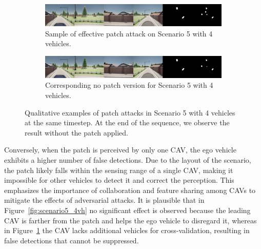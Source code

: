 \begin{figure}[tph]
    \centering

    \begin{subfigure}[b]{1\textwidth}
        \centering
        \includegraphics[width=\textwidth]{figures/results/scenario5.png}
        \caption{Sample of effective patch attack on Scenario 5 with 4 vehicles.}
        \label{fig:scenario5_4vh_effect}
    \end{subfigure}
    \vspace{0.5cm}

    \begin{subfigure}[b]{1\textwidth}
        \centering
        \includegraphics[width=\textwidth]{figures/results/scenario5gt.png}
        \caption{Corresponding no patch version for Scenario 5 with 4 vehicles.}
        \label{fig:scenario5_gt4vh_effect}
    \end{subfigure}
    \caption{
        Qualitative examples of patch attacks in Scenario 5 with 4 vehicles at the same timestep.
        At the end of the sequence, we observe the result without the patch applied.
    }
    \label{fig:scenario5_4vh_v2}
\end{figure}

Conversely, when the patch is perceived by only one CAV, the ego vehicle exhibits a higher number of false detections.
Due to the layout of the scenario, the patch likely falls within the sensing range of a single CAV, making it impossible for other vehicles to detect it and correct the perception.
This emphasizes the importance of collaboration and feature sharing among CAVs to mitigate the effects of adversarial attacks.
It is plausible that in Figure~\ref{fig:scenario5_4vh} no significant effect is observed because the leading CAV is farther from the patch and helps the ego vehicle to disregard it, whereas in Figure~\ref{fig:scenario5_4vh_effect} the CAV lacks additional vehicles for cross-validation, resulting in false detections that cannot be suppressed.
